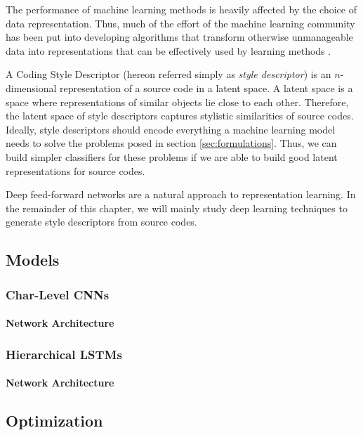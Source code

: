 The performance of machine learning methods is heavily affected by the choice of data representation. Thus, much of the effort of the machine learning community has been put into developing algorithms that transform otherwise unmanageable data into representations that can be effectively used by learning methods \cite{representation_learning}.

A Coding Style Descriptor (hereon referred simply as \textit{style descriptor}) is an $n$-dimensional representation of a source code in a latent space. A latent space is a space where representations of similar objects lie close to each other. Therefore, the latent space of style descriptors captures stylistic similarities of source codes. Ideally, style descriptors should encode everything a machine learning model needs to solve the problems posed in section \ref{sec:formulations}. Thus, we can build simpler classifiers for these problems if we are able to build good latent representations for source codes.


Deep feed-forward networks are a natural approach to representation learning. In the remainder of this chapter, we will mainly study deep learning techniques to generate style descriptors from source codes.

\subsection{Models}\label{sec:models}
\subsubsection{Char-Level CNNs}
\paragraph*{Network Architecture}
\subsubsection{Hierarchical LSTMs}
\paragraph*{Network Architecture}
\subsection{Optimization}\label{sec:optimization}